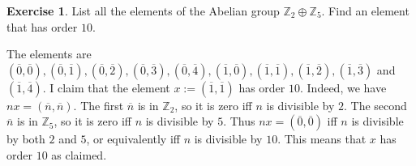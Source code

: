 \documentclass{amsart}
\newcommand{\Z}         {{\mathbb{Z}}}
\newcommand{\ov}[1]     {\overline{#1}}
\newcommand{\ip}[1]     {\langle #1\rangle}
\newcommand{\op}        {\oplus}
\renewcommand{\:}{\colon}
\theoremstyle{definition}
\newtheorem{exercise}{Exercise}[section]
\renewenvironment{solution}{\SolutionAtEnd}{\endSolutionAtEnd}
\begin{document}
\begin{exercise}
 List all the elements of the Abelian group $\Z_2\op\Z_5$.  Find an
 element that has order $10$.
\end{exercise}
\begin{solution}
 The elements are
 $(\ov{0},\ov{0}),(\ov{0},\ov{1}),(\ov{0},\ov{2}),(\ov{0},\ov{3}),
 (\ov{0},\ov{4}),(\ov{1},\ov{0}),(\ov{1},\ov{1}),(\ov{1},\ov{2}),
 (\ov{1},\ov{3})$ and $(\ov{1},\ov{4})$.  I claim that the element
 $x:=(\ov{1},\ov{1})$ has order $10$.  Indeed, we have
 $nx=(\ov{n},\ov{n})$.  The first $\ov{n}$ is in $\Z_2$, so it is zero
 iff $n$ is divisible by $2$.  The second $\ov{n}$ is in $\Z_5$, so it
 is zero iff $n$ is divisible by $5$.  Thus $nx=(\ov{0},\ov{0})$ iff
 $n$ is divisible by both $2$ and $5$, or equivalently iff $n$ is
 divisible by $10$.  This means that $x$ has order $10$ as claimed.
\end{solution}
\end{document}
